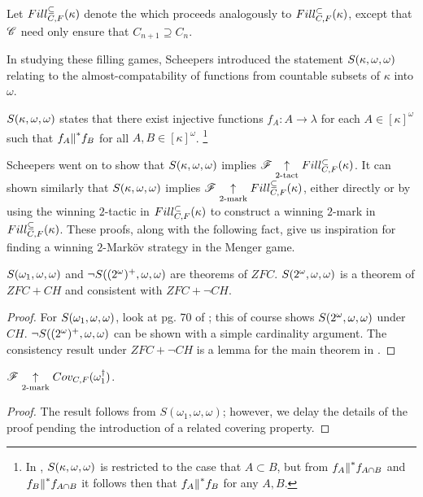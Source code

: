 \begin{game}
  Let $Fill^{\subseteq}_{C,F}(\kappa)$ denote the
   which proceeds analogously
  to $Fill^{\subset}_{C,F}(\kappa)$, except that $\mathscr{C}$ need only ensure that
  $C_{n+1}\supseteq C_n$.
\end{game}

In studying these filling games, Scheepers introduced the statement
$S(\kappa,\omega,\omega)$ relating to the almost-compatability of functions
from countable subsets of $\kappa$ into $\omega$.

\begin{defn}
  $S(\kappa,\omega,\omega)$ states that there exist injective functions
  $f_A:A\to\lambda$ for each $A\in[\kappa]^\omega$ such that $f_A{\parallel}^* f_B$
  for all $A,B\in[\kappa]^\omega$.
  \footnote{
    In \cite{MR1129143}, $S(\kappa,\omega,\omega)$ is restricted to the case that
    $A\subset B$, but from $f_A{\parallel}^* f_{A\cap B}$ and
    $f_B{\parallel}^* f_{A\cap B}$ it follows then that $f_A{\parallel}^* f_B$ for any
    $A,B$.
  }
\end{defn}

Scheepers went on to show that $S(\kappa,\omega,\omega)$ implies
$\mathscr{F} \underset{2\text{-tact}}{\uparrow} Fill^{\subset}_{C,F}(\kappa)$. It can shown similarly that
$S(\kappa,\omega,\omega)$ implies $\mathscr{F} \underset{2\text{-mark}}{\uparrow} Fill^{\subseteq}_{C,F}(\kappa)$, either directly
or by using the winning $2$-tactic in $Fill^{\subset}_{C,F}(\kappa)$ to construct a
winning $2$-mark in $Fill^{\subseteq}_{C,F}(\kappa)$. These proofs, along with the following
fact, give us inspiration for
finding a winning $2$-Mark\"ov strategy in the Menger game.

\begin{thm}
  $S(\omega_1,\omega,\omega)$ and $\neg S((2^\omega)^+,\omega,\omega)$ are theorems of $ZFC$.
  $S(2^\omega,\omega,\omega)$ is a theorem of $ZFC+CH$ and consistent with
  $ZFC+\neg CH$.
\end{thm}

\begin{proof}
  For $S(\omega_1,\omega,\omega)$, look at pg. 70 of \cite{MR597342}; this of course
  shows $S(2^\omega,\omega,\omega)$ under $CH$.
  $\neg S((2^\omega)^+,\omega,\omega)$ can be shown with a simple cardinality argument.
  The consistency result under $ZFC+\neg CH$
  is a lemma for the main theorem in \cite{MR1129143}.
\end{proof}

\begin{thm}
  $\mathscr{F} \underset{2\text{-mark}}{\uparrow} Cov_{C,F}(\omega^\dagger_1)$.
\end{thm}

\begin{proof}
  The result follows from $S(\omega_1,\omega,\omega)$; however, we delay the
  details of the proof pending the introduction of a related covering property.
\end{proof}




